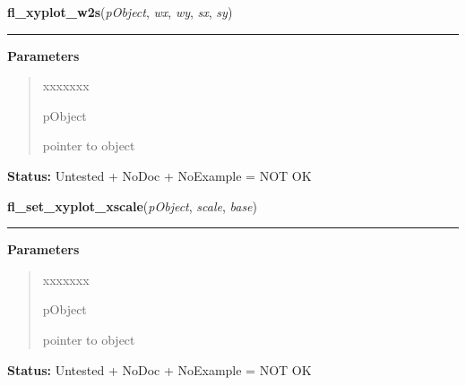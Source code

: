 \hspace{.8\funcindent}\begin{boxedminipage}{\funcwidth}

    \raggedright \textbf{fl\_xyplot\_w2s}(\textit{pObject}, \textit{wx}, \textit{wy}, \textit{sx}, \textit{sy})

    \vspace{-1.5ex}

    \rule{\textwidth}{0.5\fboxrule}
\setlength{\parskip}{2ex}
\setlength{\parskip}{1ex}
      \textbf{Parameters}
      \vspace{-1ex}

      \begin{quote}
        \begin{Ventry}{xxxxxxx}

          \item[pObject]

          pointer to object

        \end{Ventry}

      \end{quote}

\textbf{Status:} Untested + NoDoc + NoExample = NOT OK



    \end{boxedminipage}

    \label{xformslib:library:fl_set_xyplot_xscale}

    \vspace{0.5ex}

\hspace{.8\funcindent}\begin{boxedminipage}{\funcwidth}

    \raggedright \textbf{fl\_set\_xyplot\_xscale}(\textit{pObject}, \textit{scale}, \textit{base})

    \vspace{-1.5ex}

    \rule{\textwidth}{0.5\fboxrule}
\setlength{\parskip}{2ex}
\setlength{\parskip}{1ex}
      \textbf{Parameters}
      \vspace{-1ex}

      \begin{quote}
        \begin{Ventry}{xxxxxxx}

          \item[pObject]

          pointer to object

        \end{Ventry}

      \end{quote}

\textbf{Status:} Untested + NoDoc + NoExample = NOT OK



    \end{boxedminipage}

